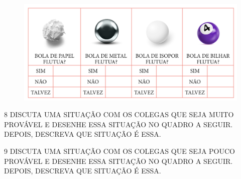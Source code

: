 \begin{figure}[htpb!]
\includegraphics[width=\textwidth]{../ilustracoes/MAT1/SAEB_1ANO_MAT_FIGURA90.png}
\end{figure}


\num{8} DISCUTA UMA SITUAÇÃO COM OS COLEGAS QUE SEJA MUITO PROVÁVEL E DESENHE
ESSA SITUAÇÃO NO QUADRO A SEGUIR. DEPOIS, DESCREVA QUE SITUAÇÃO É ESSA.

\begin{mdframed}[linewidth=2pt,linecolor=salmao,roundcorner=10pt]
\vspace{17cm}
\end{mdframed}


\num{9} DISCUTA UMA SITUAÇÃO COM OS COLEGAS QUE SEJA POUCO PROVÁVEL E DESENHE
ESSA SITUAÇÃO NO QUADRO A SEGUIR. DEPOIS, DESCREVA QUE SITUAÇÃO É ESSA.

\begin{mdframed}[linewidth=2pt,linecolor=salmao,roundcorner=10pt]
\vspace{19cm}
\end{mdframed}


